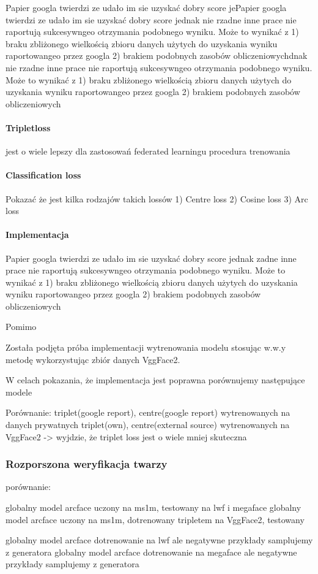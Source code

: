 Papier googla twierdzi ze udało im sie uzyskać dobry score jePapier googla twierdzi ze udało im sie uzyskać dobry score jednak nie rzadne inne prace nie raportują sukcesywngeo otrzymania podobnego wyniku. Może to wynikać z 1) braku zbliżonego wielkością zbioru danych użytych do uzyskania wyniku raportowangeo przez googla  2) brakiem podobnych zasobów obliczeniowychdnak nie rzadne inne prace nie raportują sukcesywngeo otrzymania podobnego wyniku. Może to wynikać z 1) braku zbliżonego wielkością zbioru danych użytych do uzyskania wyniku raportowangeo przez googla  2) brakiem podobnych zasobów obliczeniowych

\paragraph{Tripletloss}
jest o wiele lepszy dla zastosowań federated learningu
procedura trenowania


\paragraph{Classification loss}
Pokazać że jest kilka rodzajów takich lossów
1) Centre loss
2) Cosine loss
3) Arc loss



\paragraph{Implementacja}
Papier googla twierdzi ze udało im sie uzyskać dobry score jednak zadne inne prace nie
raportują sukcesywngeo otrzymania podobnego wyniku. Może to wynikać z 1) braku zbliżonego
wielkością zbioru danych użytych do uzyskania wyniku raportowangeo przez googla 2) brakiem
podobnych zasobów obliczeniowych

Pomimo

Została podjęta próba implementacji wytrenowania modelu stosując w.w.y metodę wykorzystując zbiór danych VggFace2. 

W celach pokazania, że implementacja jest poprawna porównujemy następujące modele

Porównanie:
 triplet(google report), centre(google report) wytrenowanych na danych prywatnych
 triplet(own), centre(external source) wytrenowanych na VggFace2
-> wyjdzie, że triplet loss jest o wiele mniej skuteczna 


\subsubsection{Rozporszona weryfikacja twarzy}
porównanie:

globalny model arcface uczony na ms1m,   testowany na lwf i megaface
globalny model arcface uczony na ms1m, dotrenowany tripletem na VggFace2, testowany


globalny model arcface dotrenowanie na lwf ale negatywne przykłady samplujemy z generatora
globalny model arcface dotrenowanie na megaface ale negatywne przykłady samplujemy z generatora



